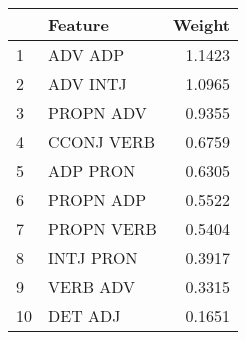 \begin{tabular}{llr}
\toprule
{} &     Feature &  Weight \\
\midrule
1  &     ADV ADP &  1.1423 \\
2  &    ADV INTJ &  1.0965 \\
3  &   PROPN ADV &  0.9355 \\
4  &  CCONJ VERB &  0.6759 \\
5  &    ADP PRON &  0.6305 \\
6  &   PROPN ADP &  0.5522 \\
7  &  PROPN VERB &  0.5404 \\
8  &   INTJ PRON &  0.3917 \\
9  &    VERB ADV &  0.3315 \\
10 &     DET ADJ &  0.1651 \\
\bottomrule
\end{tabular}

